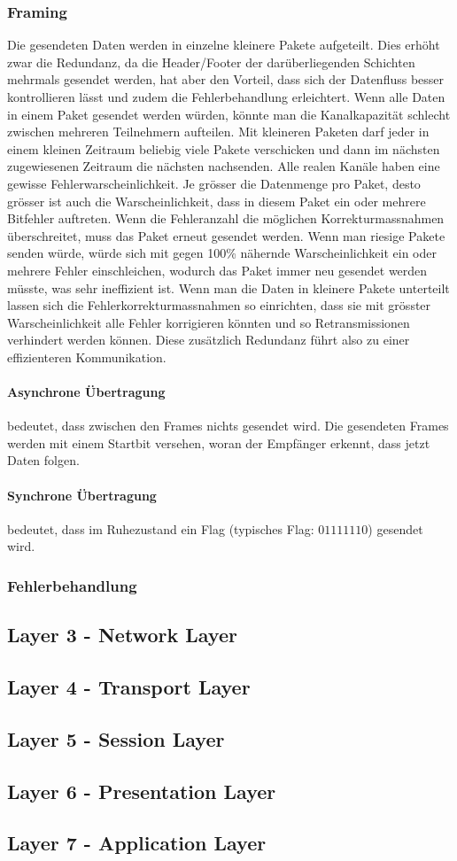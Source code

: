 \documentclass{article}
\begin{document}
\subsubsection{Framing}
Die gesendeten Daten werden in einzelne kleinere Pakete aufgeteilt. Dies erhöht zwar die Redundanz, da die Header/Footer der darüberliegenden Schichten mehrmals gesendet werden, hat aber den Vorteil, dass sich der Datenfluss besser kontrollieren lässt und zudem die Fehlerbehandlung erleichtert. Wenn alle Daten in einem Paket gesendet werden würden, könnte man die Kanalkapazität schlecht zwischen mehreren Teilnehmern aufteilen. Mit kleineren Paketen darf jeder in einem kleinen Zeitraum beliebig viele Pakete verschicken und dann im nächsten zugewiesenen Zeitraum die nächsten nachsenden. Alle realen Kanäle haben eine gewisse Fehlerwarscheinlichkeit. Je grösser die Datenmenge pro Paket, desto grösser ist auch die Warscheinlichkeit, dass in diesem Paket ein oder mehrere Bitfehler auftreten. Wenn die Fehleranzahl die möglichen Korrekturmassnahmen überschreitet, muss das Paket erneut gesendet werden. Wenn man riesige Pakete senden würde, würde sich mit gegen 100\% nähernde Warscheinlichkeit ein oder mehrere Fehler einschleichen, wodurch das Paket immer neu gesendet werden müsste, was sehr ineffizient ist. Wenn man die Daten in kleinere Pakete unterteilt lassen sich die Fehlerkorrekturmassnahmen so einrichten, dass sie mit grösster Warscheinlichkeit alle Fehler korrigieren könnten und so Retransmissionen verhindert werden können. Diese zusätzlich Redundanz führt also zu einer effizienteren Kommunikation.
\paragraph{Asynchrone Übertragung} bedeutet, dass zwischen den Frames nichts gesendet wird. Die gesendeten Frames werden mit einem Startbit versehen, woran der Empfänger erkennt, dass jetzt Daten folgen.
\paragraph{Synchrone Übertragung} bedeutet, dass im Ruhezustand ein Flag (typisches Flag: $01111110$) gesendet wird.
\subsubsection{Fehlerbehandlung}

\subsection{Layer 3 - Network Layer}
\subsection{Layer 4 - Transport Layer}
\subsection{Layer 5 - Session Layer}
\subsection{Layer 6 - Presentation Layer}
\subsection{Layer 7 - Application Layer}
\end{document}
